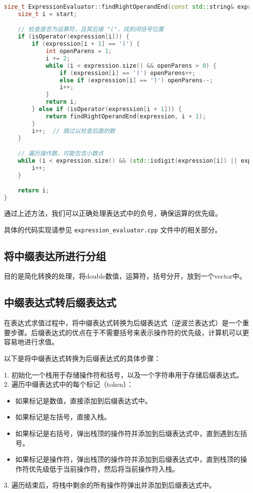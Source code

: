 \documentclass[UTF8]{ctexart}
\begin{document}
\begin{lstlisting}[language=C++, breaklines=true]
size_t ExpressionEvaluator::findRightOperandEnd(const std::string& expression, size_t start) {
    size_t i = start;

    // 检查是否为运算符，且其后接 "("，找到闭括号位置
    if (isOperator(expression[i])) {
        if (expression[i + 1] == '(') {
            int openParens = 1;
            i += 2;
            while (i < expression.size() && openParens > 0) {
                if (expression[i] == '(') openParens++;
                else if (expression[i] == ')') openParens--;
                i++;
            }
            return i;
        } else if (isOperator(expression[i + 1])) {
            return findRightOperandEnd(expression, i + 1);
        }
        i++;  // 跳过以检查后面的数
    }

    // 遍历操作数，可能包含小数点 
    while (i < expression.size() && (std::isdigit(expression[i]) || expression[i] == '.')) {
        i++;
    }

    return i;
}
\end{lstlisting}

通过上述方法，我们可以正确处理表达式中的负号，确保运算的优先级。

具体的代码实现请参见 \texttt{expression\_evaluator.cpp} 文件中的相关部分。

\subsection{将中缀表达所进行分组}

目的是简化转换的处理，将double数值，运算符，括号分开，放到一个vector中。

\subsection{中缀表达式转后缀表达式}

在表达式求值过程中，将中缀表达式转换为后缀表达式（逆波兰表达式）是一个重要步骤。后缀表达式的优点在于不需要括号来表示操作符的优先级，计算机可以更容易地进行求值。

以下是将中缀表达式转换为后缀表达式的具体步骤：

1. 初始化一个栈用于存储操作符和括号，以及一个字符串用于存储后缀表达式。
2. 遍历中缀表达式中的每个标记（token）：
   \begin{itemize}
     \item 如果标记是数值，直接添加到后缀表达式中。
     \item 如果标记是左括号，直接入栈。
     \item 如果标记是右括号，弹出栈顶的操作符并添加到后缀表达式中，直到遇到左括号。
     \item 如果标记是操作符，弹出栈顶的操作符并添加到后缀表达式中，直到栈顶的操作符优先级低于当前操作符，然后将当前操作符入栈。
   \end{itemize}
3. 遍历结束后，将栈中剩余的所有操作符弹出并添加到后缀表达式中。
\end{document}
